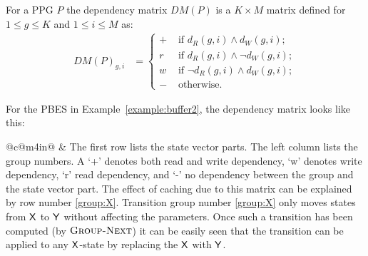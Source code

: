 \documentclass{article}
\begin{document}
\begin{definition}\label{def:dependencymatrix}
For a PPG $P$ the dependency matrix $DM(P)$ is a $K \times M$ matrix
defined for $1 \leq g \leq K$ and $1 \leq i \leq M$ as:
\begin{align*}
DM(P)_{g,i} &= 
\begin{cases}
+ & \text{ if } d_{R}(g, i) \land d_{W}(g, i); \\
r & \text{ if } d_{R}(g, i) \land \neg d_{W}(g, i); \\
w & \text{ if } \neg d_{R}(g, i) \land d_{W}(g, i); \\
- & \text{ otherwise. }
\end{cases}
\end{align*}
\end{definition}


\begin{example}
For the PBES in Example~\ref{example:buffer2}, the dependency matrix looks like this:\\
\begin{tabular*}{\textwidth}{@{}c@{\extracolsep{\fill}}m{4in}@{}}
& \smallskip
The first row lists the state vector parts. The left column lists the group numbers. A `+' denotes both read and write dependency, `w' denotes write dependency, `r' read dependency, and `-' no dependency between the group and the state vector part.
The effect of caching due to this matrix can be explained by row number \ref{group:X}. Transition group number 
\ref{group:X} only moves states from $\mathsf{X}$ to $\mathsf{Y}$ without affecting the parameters.
Once such a transition has been computed (by $\textsc{Group-Next}$) it can be easily seen 
that the transition can be applied to any $\mathsf{X}$-state by replacing the $\mathsf{X}$ with
$\mathsf{Y}$. 
\end{tabular*}
\end{example}
\end{document}
